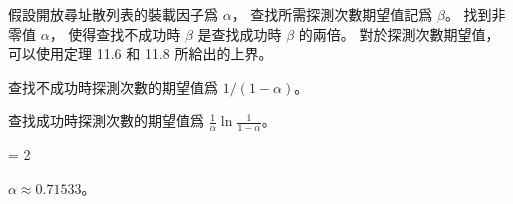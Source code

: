 \startEXERCISE\DIFFICULT
假設開放尋址散列表的裝載因子爲 $\alpha$，
查找所需探測次數期望值記爲 $\beta$。
找到非零值 $\alpha$，
使得查找不成功時 $\beta$ 是查找成功時 $\beta$ 的兩倍。
對於探測次數期望值，可以使用定理 11.6 和 11.8 所給出的上界。
\stopEXERCISE

\startANSWER
查找不成功時探測次數的期望值爲 $1/(1-\alpha)$。

查找成功時探測次數的期望值爲 $\frac{1}{\alpha}\ln\frac{1}{1-\alpha}$。

\startformula
{} = 2 \cdot {}\ln{}
\stopformula

$\alpha\approx 0.71533$。
\stopANSWER
